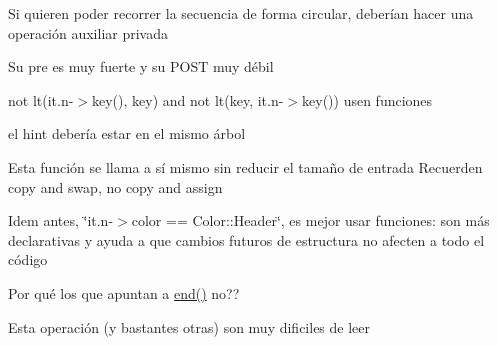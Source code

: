 \begin{DoxyRefList}
Si quieren poder recorrer la secuencia de forma circular, deberían hacer una operación auxiliar privada 
\item[\label{deprecated__deprecated000022}%
\hypertarget{deprecated__deprecated000022}{}%
Miembro \hyperlink{classaed2_1_1map_1_1iterator_ad052c1ef8477a1613c292202226053a5_ad052c1ef8477a1613c292202226053a5}{aed2\+:\+:map$<$ Key, Meaning, Compare $>$\+:\+:iterator\+:\+:operator==} (iterator other) const ]Su pre es muy fuerte y su P\+O\+ST muy débil 
\item[\label{deprecated__deprecated000010}%
\hypertarget{deprecated__deprecated000010}{}%
Miembro \hyperlink{classaed2_1_1map_a3399d36fdd5a880b494f3a5795d3f18f_a3399d36fdd5a880b494f3a5795d3f18f}{aed2\+:\+:map$<$ Key, Meaning, Compare $>$\+:\+:lower\+\_\+bound} (const Key \&key) const ]not lt(it.\+n-\/$>$key(), key) and not lt(key, it.\+n-\/$>$key()) usen funciones 
\item[\label{deprecated__deprecated000003}%
\hypertarget{deprecated__deprecated000003}{}%
Miembro \hyperlink{classaed2_1_1map_a7a77950a3d8e637bfa7cf5dcd904f257_a7a77950a3d8e637bfa7cf5dcd904f257}{aed2\+:\+:map$<$ Key, Meaning, Compare $>$\+:\+:map} (const map \&other)]el hint debería estar en el mismo árbol 
\item[\label{deprecated__deprecated000004}%
\hypertarget{deprecated__deprecated000004}{}%
Miembro \hyperlink{classaed2_1_1map_ac606d334809066929522964d45e76317_ac606d334809066929522964d45e76317}{aed2\+:\+:map$<$ Key, Meaning, Compare $>$\+:\+:operator=} (map other)]Esta función se llama a sí mismo sin reducir el tamaño de entrada Recuerden copy and swap, no copy and assign 
\item[\label{deprecated__deprecated000007}%
\hypertarget{deprecated__deprecated000007}{}%
Miembro \hyperlink{classaed2_1_1map_a96f23896164ab47bee48c26b803f9801_a96f23896164ab47bee48c26b803f9801}{aed2\+:\+:map$<$ Key, Meaning, Compare $>$\+:\+:operator\mbox{[}\mbox{]}} (const Key \&key)]Idem antes, \char`\"{}it.\+n-\/$>$color == Color\+::\+Header\char`\"{}, es mejor usar funciones\+: son más declarativas y ayuda a que cambios futuros de estructura no afecten a todo el código 
\item[\label{deprecated__deprecated000005}%
\hypertarget{deprecated__deprecated000005}{}%
Miembro \hyperlink{classaed2_1_1map_ab22c9a85c2dadbc286cd30e97069a8e6_ab22c9a85c2dadbc286cd30e97069a8e6}{aed2\+:\+:map$<$ Key, Meaning, Compare $>$\+:\+:$\sim$map} ()]Por qué los que apuntan a \hyperlink{classaed2_1_1map_a76023e6a56cb625513e1b5ea028bf983_a76023e6a56cb625513e1b5ea028bf983}{end()} no?? 
\item[\label{deprecated__deprecated000001}%
\hypertarget{deprecated__deprecated000001}{}%
Página \hyperlink{axiomas}{Axiomas y proposiciones auxiliares} ]Esta operación (y bastantes otras) son muy dificiles de leer 


\end{DoxyRefList}
